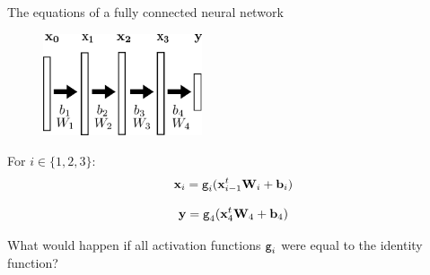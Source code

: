 \documentclass[xcolor=pdftex,dvipsnames,table,mathserif]{beamer}
\begin{document}
\begin{frame}{The equations of a fully connected neural network}

  \begin{figure}
    \includegraphics[height=3cm]{nn_representation2}
  \end{figure}

  \begin{block}{}
    For $i \in \{1, 2, 3\}$:
    \[\mathbf{x}_i = \texttt{g}_i(\mathbf{x}_{i-1}^t \mathbf{W}_i + \mathbf{b}_i)\]
  \end{block}
  \begin{block}{}
    \[\mathbf{y} = \texttt{g}_4(\mathbf{x}_4^t \mathbf{W}_4 + \mathbf{b}_4)\]
  \end{block}

  \pause

  What would happen if all activation functions $\texttt{g}_i$ were equal to the identity function?

\end{frame}
\end{document}
